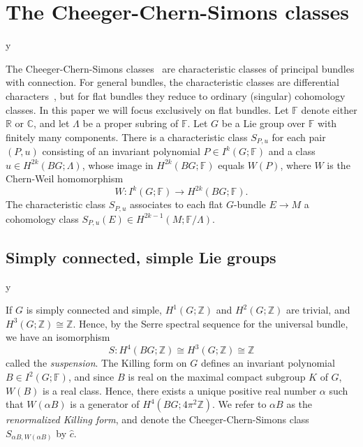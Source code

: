 \documentclass[11pt]{amsart}
\theoremstyle{definition}
\numberwithin{equation}{section}
\def\printname#1{
        \if\draft y
                \smash{\makebox[0pt]{\hspace{-0.5in}
                        \raisebox{8pt}{\tt\tiny #1}}}
        \fi
}
\def\lbl#1{\label{#1}\printname{#1}}
\newcommand{\R}{\mathbb R}
\newcommand{\C}{\mathbb C}
\newcommand{\F}{\mathbb F}
\newcommand{\Z}{\mathbb Z}
\begin{document}
\section{The Cheeger-Chern-Simons classes}
\lbl{sec.CCS}



The Cheeger-Chern-Simons classes~\cite{CheegerSimons,ChernSimons} are 
characteristic classes of principal bundles with connection. For general 
bundles, the characteristic classes are differential 
characters~\cite{CheegerSimons}, but for flat bundles they reduce to 
ordinary (singular) cohomology classes. In this paper we will focus 
exclusively on flat bundles. %
Let $\F$ denote either $\R$ or $\C$, and let $\Lambda$ be a proper subring 
of $\F$. Let $G$ be a Lie group over $\F$ with finitely many components. 
There is a characteristic class $S_{P,u}$ for each pair $(P,u)$ consisting 
of an invariant polynomial $P\in I^k(G;\F)$ and a class 
$u\in H^{2k}(BG;\Lambda)$, whose image in $H^{2k}(BG;\F)$ equals $W(P)$, 
where $W$ is the Chern-Weil homomorphism
\begin{equation}
W\colon I^k(G;\F)\to H^{2k}(BG;\F).
\end{equation}
The characteristic class $S_{P,u}$ associates to each flat $G$-bundle 
$E\to M$ a cohomology class $S_{P,u}(E)\in H^{2k-1}(M;\F/\Lambda)$.


\subsection{Simply connected, simple Lie groups} 
\lbl{sub.simplelie}

If $G$ is simply connected and simple, $H^1(G;\Z)$ and $H^2(G;\Z)$ are 
trivial, and $H^3(G;\Z)\cong\Z$. Hence, by the Serre spectral sequence 
for the universal bundle, we have an isomorphism
\begin{equation}
S\colon H^{4}(BG;\Z)\cong H^{3}(G;\Z)\cong\Z
\end{equation}
called the \emph{suspension}.
The Killing form on $G$ defines an invariant polynomial $B\in I^2(G;\F)$, 
and since $B$ is real on the maximal compact subgroup $K$ of $G$, $W(B)$ 
is a real class. Hence, there exists a unique positive real number $\alpha$ 
such that $W(\alpha B)$ is a generator of $H^4(BG;4\pi^2\Z)$. We refer to 
$\alpha B$ as the \emph{renormalized Killing form}, and denote the 
Cheeger-Chern-Simons class $S_{\alpha B,W(\alpha B)}$ by $\widehat c$. 
\end{document}
